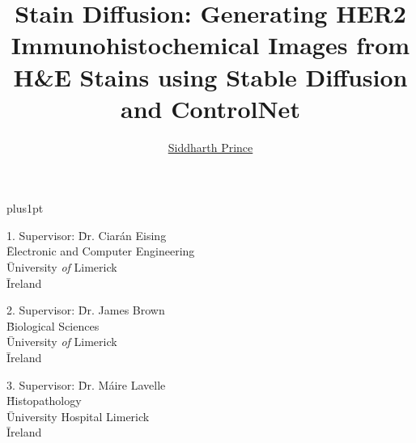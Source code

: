 \documentclass[oneside,12pt]{Latex/Classes/PhDthesisPSnPDF}
\title{Stain Diffusion: Generating HER2 Immunohistochemical Images from H\&E Stains using Stable Diffusion and ControlNet}
\author{\href{mailto: sprince.ie.31@gmail.com}{Siddharth Prince}}
\begin{document}



\renewcommand\baselinestretch{1.2}
\baselineskip=18pt plus1pt



\maketitle  %



\newpage


 \begin{tabbing}
1.  Supervisor: \= Dr. Ciarán Eising    \\
 \>  \= Electronic and Computer Engineering\\
 \>  \= University \emph{of} Limerick \\
 \>  \= Ireland \\
 \end{tabbing}


 \begin{tabbing}
2. Supervisor: \= Dr. James Brown \\
 \>  \= Biological Sciences \\
 \>  \= University \emph{of} Limerick \\
 \>  \= Ireland \\
\end{tabbing}

\begin{tabbing}
3. Supervisor: \= Dr. Máire Lavelle \\
 \>  \= Histopathology \\
 \>  \= University Hospital Limerick \\
 \>  \= Ireland \\
\end{tabbing}


\vspace{10mm}




\end{document}
